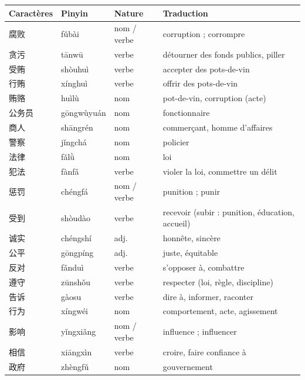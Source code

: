 \documentclass[11pt]{article}
\begin{document}
\begin{aretenir}
\begin{center}
\begin{tabularx}{\linewidth}{|X|X|X|X|}
\hline
\rowcolor{popblueL} \textbf{Caractères} & \textbf{Pinyin} & \textbf{Nature} & \textbf{Traduction} \\ \hline
腐败 & fǔbài & nom / verbe & corruption ; corrompre \\ \hline
贪污 & tānwū & verbe & détourner des fonds publics, piller \\ \hline
受贿 & shòuhuì & verbe & accepter des pots-de-vin \\ \hline
行贿 & xínghuì & verbe & offrir des pots-de-vin \\ \hline
贿赂 & huìlù & nom & pot-de-vin, corruption (acte) \\ \hline
公务员 & gōngwùyuán & nom & fonctionnaire \\ \hline
商人 & shāngrén & nom & commerçant, homme d'affaires \\ \hline
警察 & jǐngchá & nom & policier \\ \hline
法律 & fǎlǜ & nom & loi \\ \hline
犯法 & fànfǎ & verbe & violer la loi, commettre un délit \\ \hline
惩罚 & chéngfá & nom / verbe & punition ; punir \\ \hline
受到 & shòudào & verbe & recevoir (subir : punition, éducation, accueil) \\ \hline
诚实 & chéngshí & adj. & honnête, sincère \\ \hline
公平 & gōngpíng & adj. & juste, équitable \\ \hline
反对 & fǎnduì & verbe & s'opposer à, combattre \\ \hline
遵守 & zūnshǒu & verbe & respecter (loi, règle, discipline) \\ \hline
告诉 & gàosu & verbe & dire à, informer, raconter \\ \hline
行为 & xíngwéi & nom & comportement, acte, agissement \\ \hline
影响 & yǐngxiǎng & nom / verbe & influence ; influencer \\ \hline
相信 & xiāngxìn & verbe & croire, faire confiance à \\ \hline
政府 & zhèngfǔ & nom & gouvernement \\ \hline
\end{tabularx}
\end{center}
\end{aretenir}
\end{document}
